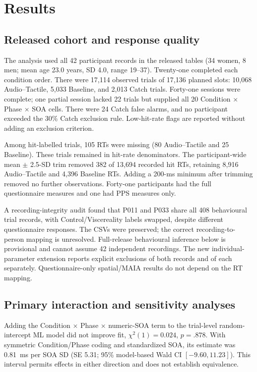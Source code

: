 \section{Results}

\subsection{Released cohort and response quality}

The analysis used all 42 participant records in the released tables (34 women, 8 men; mean age 23.0 years, SD 4.0, range 19--37). Twenty-one completed each condition order. There were 17{,}114 observed trials of 17{,}136 planned slots: 10{,}068 Audio--Tactile, 5{,}033 Baseline, and 2{,}013 Catch trials. Forty-one sessions were complete; one partial session lacked 22 trials but supplied all 20 Condition $\times$ Phase $\times$ SOA cells. There were 24 Catch false alarms, and no participant exceeded the 30\% Catch exclusion rule. Low-hit-rate flags are reported without adding an exclusion criterion.

Among hit-labelled trials, 105 RTs were missing (80 Audio--Tactile and 25 Baseline). These trials remained in hit-rate denominators. The participant-wide mean $\pm$ 2.5-SD trim removed 382 of 13{,}694 recorded hit RTs, retaining 8{,}916 Audio--Tactile and 4{,}396 Baseline RTs. Adding a 200-ms minimum after trimming removed no further observations. Forty-one participants had the full questionnaire measures and one had PPS measures only.

A recording-integrity audit found that P011 and P033 share all 408 behavioural trial records, with Control/Viscereality labels swapped, despite different questionnaire responses. The CSVs were preserved; the correct recording-to-person mapping is unresolved. Full-release behavioural inference below is provisional and cannot assume 42 independent recordings. The new individual-parameter extension reports explicit exclusions of both records and of each separately. Questionnaire-only spatial/MAIA results do not depend on the RT mapping.

\subsection{Primary interaction and sensitivity analyses}

Adding the Condition $\times$ Phase $\times$ numeric-SOA term to the trial-level random-intercept ML model did not improve fit, $\chi^{2}(1)=0.024$, $p=.878$. With symmetric Condition/Phase coding and standardized SOA, its estimate was 0.81~ms per SOA SD (SE 5.31; 95\% model-based Wald CI $[-9.60, 11.23]$). This interval permits effects in either direction and does not establish equivalence.


